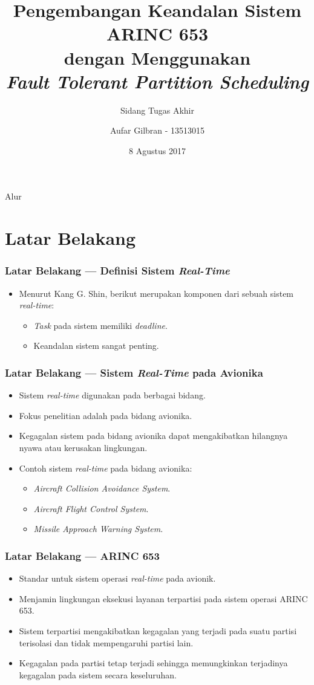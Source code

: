 \documentclass[xetex]{beamer}
\title{Pengembangan Keandalan Sistem ARINC 653\\dengan Menggunakan\\ \textit{Fault Tolerant Partition Scheduling}}
\subtitle{Sidang Tugas Akhir}
\author{Aufar Gilbran - 13513015}
\date{8 Agustus 2017}
\begin{document}
\frame{\titlepage}
\begin{frame}{Alur}
	\tableofcontents
\end{frame}

\section{Latar Belakang}
\begin{frame}
	\frametitle{Latar Belakang --- Definisi Sistem \textit{Real-Time}}
	\begin{itemize}
		\item Menurut Kang G. Shin, berikut merupakan komponen dari sebuah sistem \textit{real-time}: 
			\begin{itemize}
				\item \textit{Task} pada sistem memiliki \textit{deadline}.
				\item Keandalan sistem sangat penting.
			\end{itemize}
	\end{itemize}
\end{frame}
\begin{frame}
	\frametitle{Latar Belakang --- Sistem \textit{Real-Time} pada Avionika}
	\begin{itemize}
		\item Sistem \textit{real-time} digunakan pada berbagai bidang.
		\item Fokus penelitian adalah pada bidang avionika.
		\item Kegagalan sistem pada bidang avionika dapat mengakibatkan hilangnya nyawa atau kerusakan lingkungan.
		\item Contoh sistem \textit{real-time} pada bidang avionika:
			\begin{itemize}
				\item \textit{Aircraft Collision Avoidance System}.
				\item \textit{Aircraft Flight Control System}.
				\item \textit{Missile Approach Warning System}.
			\end{itemize}
	\end{itemize}
\end{frame}
\begin{frame}
	\frametitle{Latar Belakang --- ARINC 653}
	\begin{itemize}
		\item Standar untuk sistem operasi \textit{real-time} pada avionik.
		\item Menjamin lingkungan eksekusi layanan terpartisi pada sistem operasi ARINC 653.
		\item Sistem terpartisi mengakibatkan kegagalan yang terjadi pada suatu partisi terisolasi dan tidak mempengaruhi partisi lain.
		\item Kegagalan pada partisi tetap terjadi sehingga memungkinkan terjadinya kegagalan pada sistem secara keseluruhan.
	\end{itemize}
\end{frame}
\end{document}
